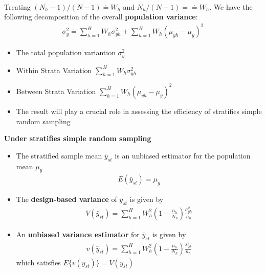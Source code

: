 \documentclass[a4paper,twoside,11pt]{article}
\begin{document}
{\begin{equation*}
\begin{aligned}
\end{aligned}
\end{equation*}
Treating $(N_h -1)/(N-1) \doteq W_h$ and $N_h/(N-1) =\doteq W_h$. We have the following decomposition of the overall \textbf{population variance}:
\begin{equation*}
\begin{aligned}
\sigma_y^2 \doteq \sum^H_{h=1} W_h \sigma_{yh}^2 + \sum^H_{h=1}W_h (\mu_{yh} - \mu_y)^2
\end{aligned}
\end{equation*}
\begin{itemize}
    \item The total population variantion $\sigma_y^2$
    \item Within Strata Variation $\sum^H_{h=1} W_h \sigma_{yh}^2$
    \item Between Strata Variation $\sum^H_{h=1} W_h(\mu_{yh} - \mu_y)^2$
    \item The result will play a crucial role in assessing the efficiency of stratifies simple random sampling
\end{itemize}
\textbf{Under stratifies simple random sampling}
\begin{itemize}
    \item The stratified sample mean $\bar{y}_{st}$ is an unbiased estimator for the population mean $\mu_y$
\newline
\begin{equation*}
\begin{aligned}
E(\bar{y}_{st}) = \mu_y
\end{aligned}
\end{equation*}
    \item The \textbf{design-based variance} of $\bar{y}_{st}$ is given by
\newline
\begin{equation*}
\begin{aligned}
V(\bar{y}_{st}) = \sum^H_{h=1} W_h^2 (1-\frac{n_h}{N_h}) \frac{\sigma^2_{yh}}{n_h}
\end{aligned}
\end{equation*}
    \item An \textbf{unbiased variance estimator} for $\bar{y}_{st}$ is given by
\newline
\begin{equation*}
\begin{aligned}
v(\hat{y}_{st}) = \sum^H_{h=1} W_h^2 (1-\frac{n_h}{N_h}) \frac{s_{yh}^2}{n_h}
\end{aligned}
\end{equation*}
which satisfies $E\{ v(\bar{y}_{st}) \} = V(\bar{y}_{st})$
\end{itemize}
}
\end{document}
